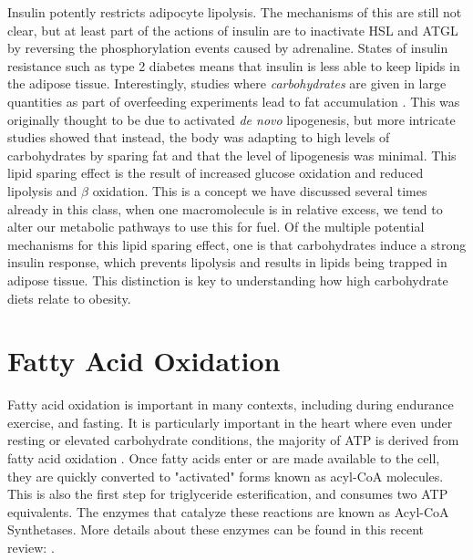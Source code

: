 \documentclass{tufte-handout}
\begin{document}
Insulin potently restricts adipocyte lipolysis.  The mechanisms of this are still not clear, but at least part of the actions of insulin are to inactivate HSL and ATGL by reversing the phosphorylation events caused by adrenaline.   States of insulin resistance such as type 2 diabetes means that insulin is less able to keep lipids in the adipose tissue.  Interestingly, studies where \emph{carbohydrates} are given in large quantities as part of overfeeding experiments lead to fat accumulation \citep{Acheson1988}.  This was originally thought to be due to activated \textit{de novo} lipogenesis, but more intricate studies showed that instead, the body was adapting to high levels of carbohydrates by sparing fat \citep{McDevitt2001} and that the level of lipogenesis was minimal.  This lipid sparing effect is the result of increased glucose oxidation and reduced lipolysis and $\beta$ oxidation.  This is a concept we have discussed several times already in this class, when one macromolecule is in relative excess, we tend to alter our metabolic pathways to use this for fuel.  Of the multiple potential mechanisms for this lipid sparing effect, one is that carbohydrates induce a strong insulin response, which prevents lipolysis and results in lipids being trapped in adipose tissue.  This distinction is key to understanding how high carbohydrate diets relate to obesity.

\section{Fatty Acid Oxidation}

Fatty acid oxidation is important in many contexts, including during endurance exercise, and fasting.  It is particularly important in the heart where even under resting or elevated carbohydrate conditions, the majority of ATP is derived from fatty acid oxidation \citep{Neeley1974}.  Once fatty acids enter or are made available to the cell, they are quickly converted to "activated" forms known as acyl-CoA molecules.  This is also the first step for triglyceride esterification, and consumes two ATP equivalents.  The enzymes that catalyze these reactions are known as Acyl-CoA Synthetases.  More details about these enzymes can be found in this recent review: \citep{Grevengoed2014}.
\end{document}

